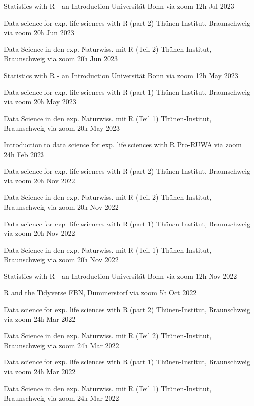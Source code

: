 \documentclass[11pt,a4paper,]{awesome-cv}
\begin{document}
\begin{cvhonors} 
\cvhonor
{Statistics with R - an Introduction  }
{Universität Bonn via zoom}
{12h}
{Jul 2023  }

\cvhonor
{Data science for exp. life sciences with R (part 2)  }
{Thünen-Institut, Braunschweig via zoom}
{20h}
{Jun 2023  }

\cvhonor
{Data Science in den exp. Naturwiss. mit R (Teil 2)  }
{Thünen-Institut, Braunschweig via zoom}
{20h}
{Jun 2023  }

\cvhonor
{Statistics with R - an Introduction  }
{Universität Bonn via zoom}
{12h}
{May 2023  }

\cvhonor
{Data science for exp. life sciences with R (part 1)  }
{Thünen-Institut, Braunschweig via zoom}
{20h}
{May 2023  }

\cvhonor
{Data Science in den exp. Naturwiss. mit R (Teil 1)  }
{Thünen-Institut, Braunschweig via zoom}
{20h}
{May 2023  }

\cvhonor
{Introduction to data science for exp. life sciences with R  }
{Pro-RUWA via zoom}
{24h}
{Feb 2023  }

\cvhonor
{Data science for exp. life sciences with R (part 2)  }
{Thünen-Institut, Braunschweig via zoom}
{20h}
{Nov 2022  }

\cvhonor
{Data Science in den exp. Naturwiss. mit R (Teil 2)  }
{Thünen-Institut, Braunschweig via zoom}
{20h}
{Nov 2022  }

\cvhonor
{Data science for exp. life sciences with R (part 1)  }
{Thünen-Institut, Braunschweig via zoom}
{20h}
{Nov 2022  }

\cvhonor
{Data Science in den exp. Naturwiss. mit R (Teil 1)  }
{Thünen-Institut, Braunschweig via zoom}
{20h}
{Nov 2022  }

\cvhonor
{Statistics with R - an Introduction  }
{Universität Bonn via zoom}
{12h}
{Nov 2022  }

\cvhonor
{R and the {Tidyverse}  }
{FBN, Dummerstorf via zoom}
{5h}
{Oct 2022  }

\cvhonor
{Data science for exp. life sciences with R (part 2)  }
{Thünen-Institut, Braunschweig via zoom}
{24h}
{Mar 2022  }

\cvhonor
{Data Science in den exp. Naturwiss. mit R (Teil 2)  }
{Thünen-Institut, Braunschweig via zoom}
{24h}
{Mar 2022  }

\cvhonor
{Data science for exp. life sciences with R (part 1)  }
{Thünen-Institut, Braunschweig via zoom}
{24h}
{Mar 2022  }

\cvhonor
{Data Science in den exp. Naturwiss. mit R (Teil 1)  }
{Thünen-Institut, Braunschweig via zoom}
{24h}
{Mar 2022  }


\end{cvhonors}
\end{document}
